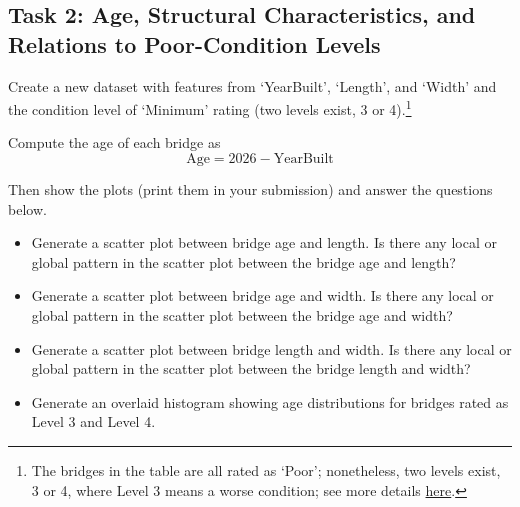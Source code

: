 \documentclass[12pt]{article}
\begin{document}
\subsection{Task 2: Age, Structural Characteristics, and Relations to Poor-Condition Levels}
Create a new dataset with features from `YearBuilt', `Length', and `Width' and the condition level of `Minimum' rating (two levels exist, 3 or 4).\footnote{The bridges in the table are all rated as `Poor'; nonetheless, two levels exist, 3 or 4, where Level 3 means a worse condition; see more details \href{https://www.modot.org/Bridges}{here}.}

Compute the age of each bridge as 
\[
\text{Age} = 2026 - \text{YearBuilt}
\]

Then show the plots (print them in your submission) and answer the questions below.
\begin{itemize}
    \item Generate a scatter plot between bridge age and length. Is there any local or global pattern in the scatter plot between the bridge age and length?
    \item Generate a scatter plot between bridge age and width. Is there any local or global pattern in the scatter plot between the bridge age and width?
    \item Generate a scatter plot between bridge length and width. Is there any local or global pattern in the scatter plot between the bridge length and width?
    \item Generate an overlaid histogram showing age distributions for bridges rated as Level 3 and Level 4.
\end{itemize}
\end{document}
